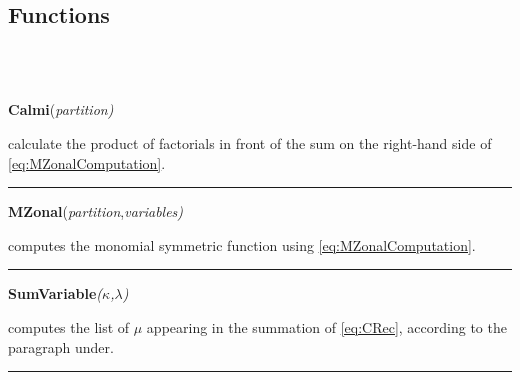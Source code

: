 \documentclass[10pt,oneside,american]{amsart}
\numberwithin{equation}{section}
\numberwithin{figure}{section}
\theoremstyle{plain}
\theoremstyle{definition}
\theoremstyle{remark}
\theoremstyle{plain}
\theoremstyle{definition}
\theoremstyle{plain}
\theoremstyle{plain}
\begin{document}
\subsection{Functions}

~\\
~
\noindent \begin{flushleft}
\textbf{Calmi}(\emph{partition)}
\par\end{flushleft}

\noindent \begin{flushleft}
calculate the product of factorials in front of the sum on the right-hand
side of \eqref{eq:MZonalComputation}.
\par\end{flushleft}

\noindent \begin{flushleft}
\rule[0.5ex]{1\columnwidth}{1pt}
\par\end{flushleft}

\noindent \begin{flushleft}
\textbf{MZonal}(\emph{partition},\emph{variables)}
\par\end{flushleft}

\noindent \begin{flushleft}
computes the monomial symmetric function using \eqref{eq:MZonalComputation}.
\par\end{flushleft}

\noindent \begin{flushleft}
\rule[0.5ex]{1\columnwidth}{1pt}
\par\end{flushleft}

\noindent \begin{flushleft}
\textbf{SumVariable}\emph{($\kappa$,$\lambda$)}
\par\end{flushleft}

\noindent \begin{flushleft}
computes the list of $\mu$ appearing in the summation of \eqref{eq:CRec},
according to the paragraph under.
\par\end{flushleft}

\noindent \begin{flushleft}
\rule[0.5ex]{1\columnwidth}{1pt}
\par\end{flushleft}
\end{document}
